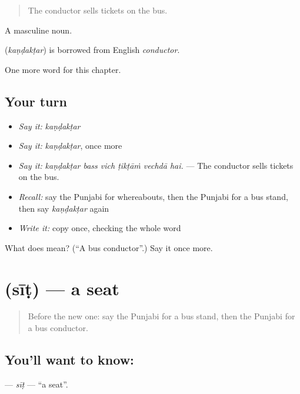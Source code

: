 \begin{quote}
The conductor sells tickets on the bus.
\end{quote}

A masculine noun.

\begin{cousinweb}
\textbf{} (\emph{kaṇḍakṭar}) is borrowed from English \emph{conductor}.
\end{cousinweb}

\begin{grammarlens}[title={What you've built}]
One more word for this chapter.
\end{grammarlens}

\subsection*{Your turn}
\begin{itemize}
\raggedright
  \item \emph{Say it:} \emph{kaṇḍakṭar}
  \item \emph{Say it:} \emph{kaṇḍakṭar}, once more
  \item \emph{Say it:} \emph{kaṇḍakṭar bass vich ṭikṭāṁ vechdā hai.} — The conductor sells tickets on the bus.
  \item \emph{Recall:} say the Punjabi for whereabouts, then the Punjabi for a bus stand, then say \emph{kaṇḍakṭar} again
  \item \emph{Write it:} copy \textbf{} once, checking the whole word
\end{itemize}

\begin{tcolorbox}[breakable,colback=teal!4,colframe=teal!35!black,title={Before you move on}]
What does  mean? (\textquotedblleft{}A bus conductor\textquotedblright{}.) Say it once more.
\end{tcolorbox}
\section[\texorpdfstring{\pa{ਸੀਟ} (sīṭ)}{ਸੀਟ (sīṭ)}]{ (sīṭ) — a seat}

\label{lesson:PA-C268-sit}



\begin{quote}
Before the new one: say the Punjabi for a bus stand, then the Punjabi for a bus conductor.
\end{quote}

\subsection*{You'll want to know: }
\textbf{} — \emph{sīṭ} — \textquotedblleft{}a seat\textquotedblright{}.

